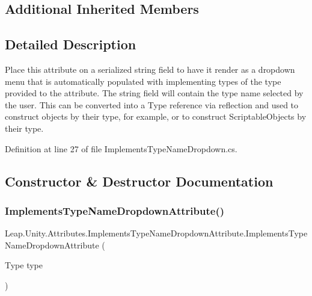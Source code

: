 \subsection*{Additional Inherited Members}


\subsection{Detailed Description}
Place this attribute on a serialized string field to have it render as a dropdown menu that is automatically populated with implementing types of the type provided to the attribute. The string field will contain the type name selected by the user. This can be converted into a Type reference via reflection and used to construct objects by their type, for example, or to construct Scriptable\+Objects by their type. 



Definition at line 27 of file Implements\+Type\+Name\+Dropdown.\+cs.



\subsection{Constructor \& Destructor Documentation}
\mbox{\label{class_leap_1_1_unity_1_1_attributes_1_1_implements_type_name_dropdown_attribute_abe2b9c79628fd26a6a0eeb45b24db341}} 
\subsubsection{\texorpdfstring{ImplementsTypeNameDropdownAttribute()}{ImplementsTypeNameDropdownAttribute()}}
{\footnotesize\ttfamily Leap.\+Unity.\+Attributes.\+Implements\+Type\+Name\+Dropdown\+Attribute.\+Implements\+Type\+Name\+Dropdown\+Attribute (\begin{DoxyParamCaption}\item[{Type}]{type }\end{DoxyParamCaption})}



